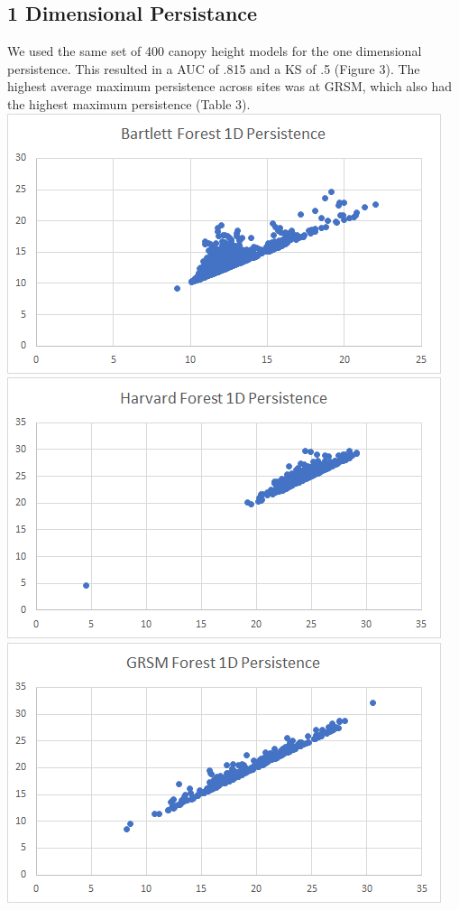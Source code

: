 \documentclass[10pt]{article}
\begin{document}
\subsection*{1 Dimensional Persistance}
We used the same set of 400 canopy height models for the one dimensional persistence. This resulted in a AUC of .815 and a KS of .5 (Figure 3). The highest average maximum persistence across sites was at GRSM, which also had the highest maximum persistence (Table 3).\\
\noindent \includegraphics[scale= 0.5]{bartlett_1d}
\includegraphics[scale= 0.5]{harvard_1d}
\includegraphics[scale= 0.5]{grsm_1d}
\end{document}
